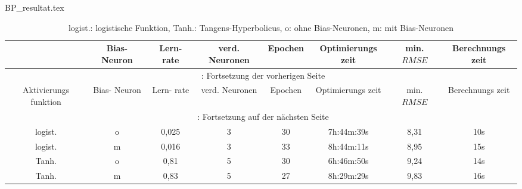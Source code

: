 
\begin{filecontents*}{BP_resultat.tex}
{
\captionsetup{skip=1pt,margin=5pt,position=below} %

\begin{longtable}{cccccccc}
    \caption[Optimale Parameter und die erreichte Prognosegenauigkeit des BP-Verf.]{Optimale Parameter und die erreichte Prognosegenauigkeit, in Form des $RMSE$-Wertes, des BP-Verfahrens.} \label{tab:BP_resultat}\\
    \toprule
    \hiderowcolors

       \multicolumn{1}{Y}{Aktivierungs funktion} &      \multicolumn{1}{Y}{Bias- Neuron} &   \multicolumn{1}{Y}{Lern- rate} &  \multicolumn{1}{Y}{verd. Neuronen} &  \multicolumn{1}{Y}{Epochen} &  \multicolumn{1}{Y}{Optimierungs zeit} & \multicolumn{1}{Y}{min. $RMSE$}  & \multicolumn{1}{Y}{Berechnungs zeit} \\

    \midrule
    \endfirsthead
        \multicolumn{8}{c}{\footnotesize \tablename\ \thetable{}: Fortsetzung der vorherigen Seite} \\
    \toprule
       \multicolumn{1}{Y}{Aktivierungs funktion} &      \multicolumn{1}{Y}{Bias- Neuron} &   \multicolumn{1}{Y}{Lern- rate} &  \multicolumn{1}{Y}{verd. Neuronen} &  \multicolumn{1}{Y}{Epochen} &  \multicolumn{1}{Y}{Optimierungs zeit} & \multicolumn{1}{Y}{min. $RMSE$}  & \multicolumn{1}{Y}{Berechnungs zeit} \\
    \midrule
    \endhead
    \midrule
        \multicolumn{8}{c}{{\footnotesize \tablename\ \thetable{}: Fortsetzung auf der nächsten Seite}} \\
    \bottomrule
    \endfoot
    \bottomrule
        \caption*{\footnotesize logist.: logistische Funktion, Tanh.: Tangens-Hyperbolicus, o: ohne Bias-Neuronen, m: mit Bias-Neuronen}

        
    \endlastfoot
    \showrowcolors
        logist.                 & o       & 0,025 & 3         & 30  & 7h:44m:39s & 8,31 & 10s         \\
        logist.                 & m       & 0,016 & 3         & 33  & 8h:44m:11s & 8,95 & 15s         \\
        Tanh.                   & o       & 0,81  & 5         & 30  & 6h:46m:50s & 9,24 & 14s         \\
        Tanh.                   & m       & 0,83  & 5         & 27  & 8h:29m:29s & 9,83 & 16s         \\

        
\end{longtable}

}
\end{filecontents*}

